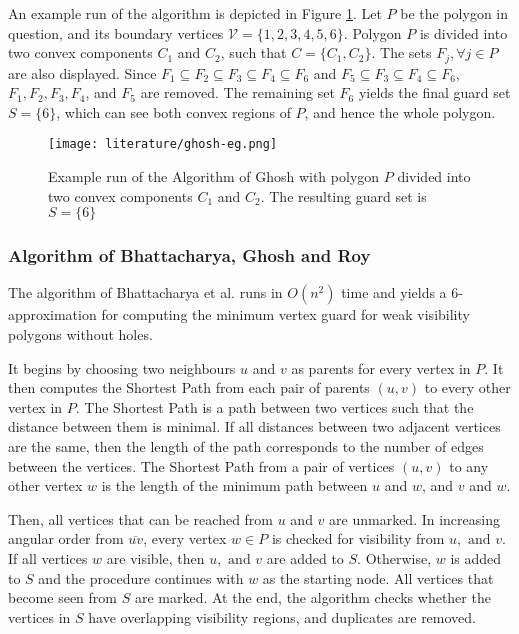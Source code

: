 
An example run of the algorithm is depicted in Figure \ref{fig:ghosh}. Let $P$ be the polygon in question, and its boundary vertices $\mathcal V = \{1, 2, 3, 4, 5, 6\}$. Polygon $P$ is divided into two convex components $C_1$ and $C_2$, such that $C = \{C_1, C_2\}$. The sets $F_j, \forall j \in P$ are also displayed. Since $F_1 \subseteq F_2 \subseteq F_3 \subseteq F_4 \subseteq F_6$ and $F_5 \subseteq F_3 \subseteq F_4 \subseteq F_6$, $F_1, F_2, F_3, F_4$, and $F_5$ are removed. The remaining set $F_6$ yields the final guard set $S = \{6\}$, which can see both convex regions of $P$, and hence the whole polygon.

\begin{figure}[h!]
    \centering
    \texttt{[image: literature/ghosh-eg.png]}
    \caption{Example run of the Algorithm of Ghosh \cite{GHOSH2010718} with polygon $P$ divided into two convex components $C_1$ and $C_2$. The resulting guard set is $S = \{6\}$}
    \label{fig:ghosh}
\end{figure}

\newpage
\subsubsection{Algorithm of Bhattacharya, Ghosh and Roy}
The algorithm of Bhattacharya et al. \cite{bhattacharya2016approximability} runs in $O(n^2)$ time and yields a 6-approximation for computing the minimum vertex guard for weak visibility polygons without holes. 

It begins by choosing two neighbours $u$ and $v$ as parents for every vertex in $P$. It then computes the Shortest Path from each pair of parents $(u, v)$ to every other vertex in $P$. The Shortest Path is a path between two vertices such that the distance between them is minimal. If all distances between two adjacent vertices are the same, then the length of the path corresponds to the number of edges between the vertices. The Shortest Path from a pair of vertices $(u, v)$ to any other vertex $w$ is the length of the minimum path between $u$ and $w$, and $v$ and $w$.

Then, all vertices that can be reached from $u$ and $v$ are unmarked. In increasing angular order from $\overline{uv}$, every vertex $w \in P$ is checked for visibility from $u, \text{ and } v$. If all vertices $w$ are visible, then $u, \text{ and }v$ are added to $S$. Otherwise, $w$ is added to $S$ and the procedure continues with $w$ as the starting node. All vertices that become seen from $S$ are marked. At the end, the algorithm checks whether the vertices in $S$ have overlapping visibility regions, and duplicates are removed.

